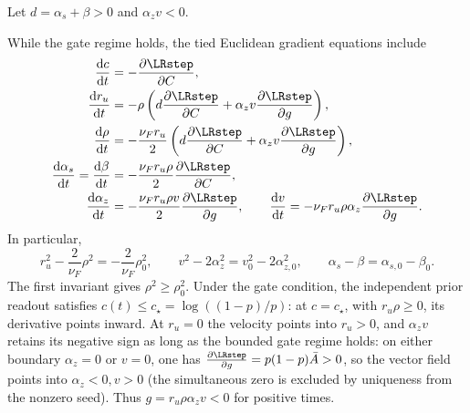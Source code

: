 Let $d=\alpha_s+\beta>0$ and $\alpha_z v<0$.

While the gate regime holds, the tied Euclidean gradient equations include
\begin{align}
 \ddt{c}&=-\pd{\LRstep}{C},\label{eq:lr-factor-u}\\
 \ddt{r_u}&=-\rho\left(d\pd{\LRstep}{C}+\alpha_z v\pd{\LRstep}{g}\right),\\
 \ddt{\rho}&=-\frac{\nu_F r_u}{2}
 \left(d\pd{\LRstep}{C}+\alpha_z v\pd{\LRstep}{g}\right),\\
 \ddt{\alpha_s}=\ddt{\beta}&=-\frac{\nu_F r_u\rho}{2}\pd{\LRstep}{C},\\
 \ddt{\alpha_z}&=-\frac{\nu_F r_u\rho v}{2}\pd{\LRstep}{g},\qquad
 \ddt{v}=-\nu_F r_u\rho\alpha_z\pd{\LRstep}{g}.
 \label{eq:lr-factor-bv}
\end{align}
In particular,
\begin{equation}\label{eq:lr-factor-invariants}
 r_u^2-\frac{2}{\nu_F}\rho^2=-\frac{2}{\nu_F}\rho_0^2,
 \qquad
 v^2-2\alpha_z^2=v_0^2-2\alpha_{z,0}^2,
 \qquad \alpha_s-\beta=\alpha_{s,0}-\beta_0.
\end{equation}
The first invariant gives $\rho^2\ge\rho_0^2$.  Under the gate
condition, the independent prior readout satisfies
$c(t)\le c_\star=\log((1-p)/p)$: at $c=c_\star$, with $r_u\rho\ge0$,
its derivative points inward.  At $r_u=0$ the velocity points into $r_u>0$,
and $\alpha_z v$ retains its negative sign as long as the bounded gate regime
holds: on either boundary $\alpha_z=0$ or $v=0$, one has $\pd{\LRstep}{g}=p(1-p)\bar A>0$,
so the vector field points into $\alpha_z<0,v>0$ (the simultaneous zero is excluded
by uniqueness from the nonzero seed). Thus $g=r_u\rho {\alpha_z v}<0$ for positive times.

